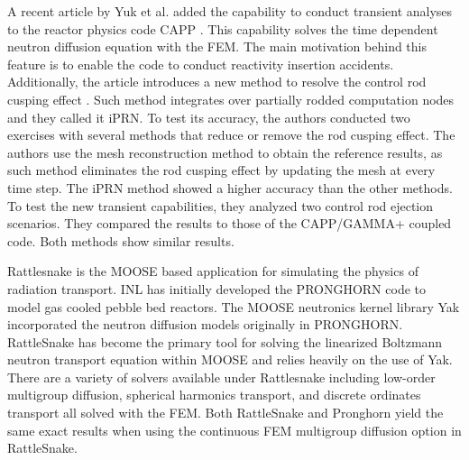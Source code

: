 \documentclass[11pt,letterpaper]{article}
\begin{document}
A recent article by Yuk et al. \cite{yuk_time-dependent_2020} added the capability to conduct transient analyses to the reactor physics code CAPP \cite{lee_development_2011}.
This capability solves the time dependent neutron diffusion equation with the \gls{FEM}.
The main motivation behind this feature is to enable the code to conduct reactivity insertion accidents.
Additionally, the article introduces a new method to resolve the control rod cusping effect \cite{joo_resolution_1984}.
Such method integrates over partially rodded computation nodes and they called it iPRN.
To test its accuracy, the authors conducted two exercises with several methods that reduce or remove the rod cusping effect.
The authors use the mesh reconstruction method to obtain the reference results, as such method eliminates the rod cusping effect by updating the mesh at every time step.
The iPRN method showed a higher accuracy than the other methods.
To test the new transient capabilities, they analyzed two control rod ejection scenarios.
They compared the results to those of the CAPP/GAMMA+ coupled code.
Both methods show similar results.




Rattlesnake \cite{wang_rattlesnake_2019} is the MOOSE \cite{gaston_moose_2009} based application for simulating the physics of radiation transport.
\gls{INL} has initially developed the PRONGHORN code to model gas cooled pebble bed reactors.
The MOOSE neutronics kernel library Yak incorporated the neutron diffusion models originally in PRONGHORN.
RattleSnake has become the primary tool for solving the linearized Boltzmann neutron transport equation within MOOSE and relies heavily on the use of Yak.
There are a variety of solvers available under Rattlesnake including low-order multigroup diffusion, spherical harmonics transport, and discrete ordinates transport all solved with the \gls{FEM}.
Both RattleSnake and Pronghorn yield the same exact results when using the continuous \gls{FEM} multigroup diffusion option in RattleSnake.
\end{document}

